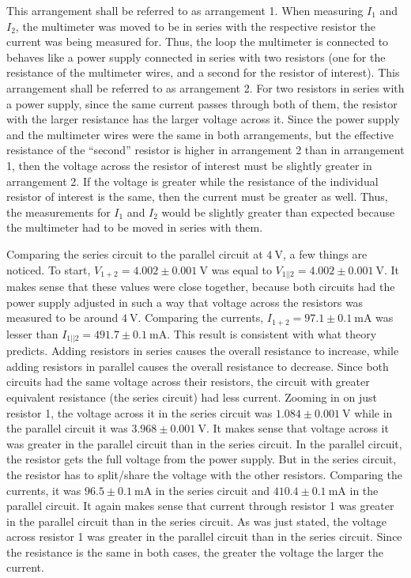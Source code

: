 \documentclass[12pt]{iopart} %
\gdef\units#1{~\mathrm{#1}}
\begin{document}
This arrangement shall be referred to as arrangement 1.
When measuring $I_1$ and $I_2$, the multimeter was moved to be in series with the respective resistor the current was being measured for.
Thus, the loop the multimeter is connected to behaves like a power supply connected in series with two resistors (one for the resistance of the multimeter wires, and a second for the resistor of interest).
This arrangement shall be referred to as arrangement 2.
For two resistors in series with a power supply, since the same current passes through both of them, the resistor with the larger resistance has the larger voltage across it.
Since the power supply and the multimeter wires were the same in both arrangements, but the effective resistance of the ``second'' resistor is higher in arrangement 2 than in arrangement 1, then the voltage across the resistor of interest must be slightly greater in arrangement 2.
If the voltage is greater while the resistance of the individual resistor of interest is the same, then the current must be greater as well.
Thus, the measurements for $I_1$ and $I_2$ would be slightly greater than expected because the multimeter had to be moved in series with them.

Comparing the series circuit to the parallel circuit at $4 \units{V}$, a few things are noticed.
To start, $V_{1+2} = 4.002 \pm 0.001 \units{V}$ was equal to $V_{1||2} = 4.002 \pm 0.001 \units{V}$.
It makes sense that these values were close together, because both circuits had the power supply adjusted in such a way that voltage across the resistors was measured to be around $4 \units{V}$.
Comparing the currents, $I_{1+2} = 97.1 \pm 0.1 \units{mA}$ was lesser than $I_{1||2} = 491.7 \pm 0.1 \units{mA}$.
This result is consistent with what theory predicts.
Adding resistors in series causes the overall resistance to increase, while adding resistors in parallel causes the overall resistance to decrease.
Since both circuits had the same voltage across their resistors, the circuit with greater equivalent resistance (the series circuit) had less current.
Zooming in on just resistor 1, the voltage across it in the series circuit was $1.084 \pm 0.001 \units{V}$ while in the parallel circuit it was $3.968 \pm 0.001 \units{V}$.
It makes sense that voltage across it was greater in the parallel circuit than in the series circuit.
In the parallel circuit, the resistor gets the full voltage from the power supply.
But in the series circuit, the resistor has to split/share the voltage with the other resistors.
Comparing the currents, it was $96.5 \pm 0.1 \units{mA}$ in the series circuit and $410.4 \pm 0.1 \units{mA}$ in the parallel circuit.
It again makes sense that current through resistor 1 was greater in the parallel circuit than in the series circuit.
As was just stated, the voltage across resistor 1 was greater in the parallel circuit than in the series circuit.
Since the resistance is the same in both cases, the greater the voltage the larger the current.
\end{document}
